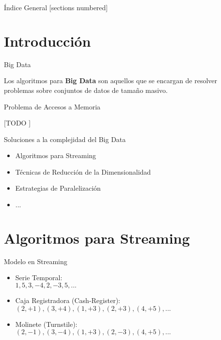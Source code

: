 \documentclass[12pt]{beamer}
\begin{document}
  \maketitle

  \begin{frame}{Índice General}
    [sections numbered]
    \tableofcontents[hideallsubsections]
  \end{frame}

  \section{Introducción}

    \begin{frame}[fragile]{Big Data}

      Los algoritmos para \textbf{Big Data} son aquellos que se encargan de resolver problemas sobre conjuntos de datos de tamaño masivo.

    \end{frame}

    \begin{frame}[fragile]{Problema de Accesos a Memoria}

      [TODO ]

    \end{frame}

    \begin{frame}[fragile]{Soluciones a la complejidad del Big Data}

      \begin{itemize}
        \item Algoritmos para Streaming
        \item Técnicas de Reducción de la Dimensionalidad
        \item Estrategias de Paralelización
        \item ...
      \end{itemize}

    \end{frame}

  \section{Algoritmos para Streaming}

    \begin{frame}[fragile]{Modelo en Streaming}

    \begin{itemize}
      \item Serie Temporal:\\
        $1, 5, 3, -4, 2, -3, 5,...$
      \item Caja Registradora (Cash-Register): \\
        $(2, +1), (3, +4), (1, +3), (2, +3), (4, +5),...$
      \item Molinete (Turnstile): \\
        $(2, -1), (3, -4), (1, +3), (2, -3), (4, +5),...$
    \end{itemize}

  \end{frame}
\end{document}
